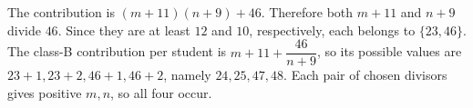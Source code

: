 The contribution is $(m+11)(n+9)+46$. Therefore both $m+11$ and $n+9$ divide $46$. Since they are at least $12$ and $10$, respectively, each belongs to $\{23,46\}$. The class-B contribution per student is $m+11+\dfrac{46}{n+9}$, so its possible values are $23+1,23+2,46+1,46+2$, namely $\boxed{24,25,47,48}$. Each pair of chosen divisors gives positive $m,n$, so all four occur.
